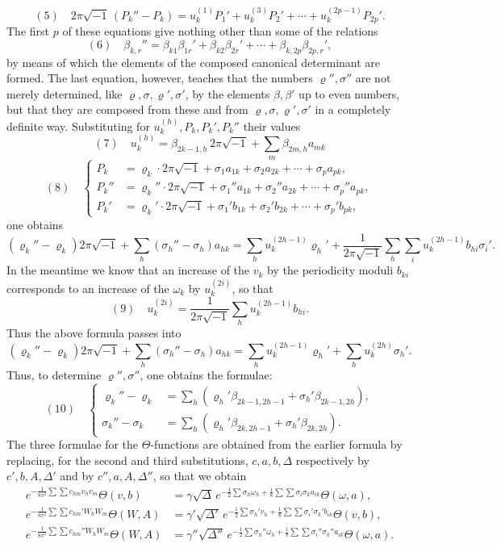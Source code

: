 \documentclass[10pt]{article}
\begin{document}
\[
(5)\quad
2\pi\sqrt{-1}\,(P_k''-P_k)
=u_k^{(1)}P_1'+u_k^{(3)}P_2'+\cdots+u_k^{(2p-1)}P_{2p}'.
\]
The first \(p\) of these equations give nothing other than some of the relations
\[
(6)\quad
\beta_{k,r}''=\beta_{k1}\beta_{1r}'+\beta_{k2}\beta_{2r}'+\cdots+\beta_{k,2p}\beta_{2p,r}',
\]
by means of which the elements of the composed canonical determinant are formed. The last equation, however, teaches that the numbers \(\varrho'',\sigma''\) are not merely determined, like \(\varrho,\sigma,\varrho',\sigma'\), by the elements \(\beta,\beta'\) up to even numbers, but that they are composed from these and from \(\varrho,\sigma,\varrho',\sigma'\) in a completely definite way. Substituting for \(u_k^{(h)},P_k,P_k',P_k''\) their values
\[
(7)\quad
u_k^{(h)}=\beta_{2k-1,h}\,2\pi\sqrt{-1}+\sum_m\beta_{2m,h}a_{mk}
\]
\[
(8)\quad
\left\{\begin{aligned}
P_k&=\varrho_k\cdot2\pi\sqrt{-1}+\sigma_1a_{1k}+\sigma_2a_{2k}+\cdots+\sigma_pa_{pk},\\
P_k''&=\varrho_k''\cdot2\pi\sqrt{-1}+\sigma_1''a_{1k}+\sigma_2''a_{2k}+\cdots+\sigma_p''a_{pk},\\
P_k'&=\varrho_k'\cdot2\pi\sqrt{-1}+\sigma_1'b_{1k}+\sigma_2'b_{2k}+\cdots+\sigma_p'b_{pk},
\end{aligned}\right.
\]
one obtains
\[
(\varrho_k''-\varrho_k)2\pi\sqrt{-1}+\sum_h(\sigma_h''-\sigma_h)a_{hk}
=\sum_h u_k^{(2h-1)}\varrho_h'
+\frac{1}{2\pi\sqrt{-1}}\sum_h\sum_i u_k^{(2h-1)}b_{hi}\sigma_i'.
\]
In the meantime we know that an increase of the \(v_k\) by the periodicity moduli \(b_{ki}\) corresponds to an increase of the \(\omega_k\) by \(u_k^{(2i)}\), so that
\[
(9)\quad
u_k^{(2i)}=\frac{1}{2\pi\sqrt{-1}}\sum_hu_k^{(2h-1)}b_{hi}.
\]
Thus the above formula passes into
\[
(\varrho_k''-\varrho_k)2\pi\sqrt{-1}+\sum_h(\sigma_h''-\sigma_h)a_{hk}
=\sum_hu_k^{(2h-1)}\varrho_h'+\sum_hu_k^{(2h)}\sigma_h'.
\]
Thus, to determine \(\varrho'',\sigma''\), one obtains the formulae:
\[
(10)\quad
\left\{\begin{aligned}
\varrho_k''-\varrho_k&=\sum_h(\varrho_h'\beta_{2k-1,2h-1}+\sigma_h'\beta_{2k-1,2h}),\\
\sigma_k''-\sigma_k&=\sum_h(\varrho_h'\beta_{2k,2h-1}+\sigma_h'\beta_{2k,2h}).
\end{aligned}\right.
\]
The three formulae for the \(\Theta\)-functions are obtained from the earlier formula by replacing, for the second and third substitutions, \(c,a,b,\Delta\) respectively by \(c',b,A,\Delta'\) and by \(c'',a,A,\Delta''\), so that we obtain
\[
\begin{aligned}
e^{-\frac{1}{8\pi^2}\sum\sum c_{hm}v_hv_m}\Theta(v,b)
&=\gamma\sqrt{\Delta}\,e^{-\frac12\sum\sigma_h\omega_h+\frac18\sum\sum\sigma_i\sigma_ka_{ik}}\Theta(\omega,a),\\
e^{-\frac{1}{8\pi^2}\sum\sum c_{hm}'W_hW_m}\Theta(W,A)
&=\gamma'\sqrt{\Delta'}\,e^{-\frac12\sum\sigma_h'v_h+\frac18\sum\sum\sigma_i'\sigma_k'b_{ik}}\Theta(v,b),\\
e^{-\frac{1}{8\pi^2}\sum\sum c_{hm}''W_hW_m}\Theta(W,A)
&=\gamma''\sqrt{\Delta''}\,e^{-\frac12\sum\sigma_h''\omega_h+\frac18\sum\sum\sigma_i''\sigma_k''a_{ik}}\Theta(\omega,a).
\end{aligned}
\]
\end{document}
